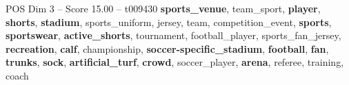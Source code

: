 \begin{textsample}{POS Dim 3 – Score 15.00 – t009430}  \label{ex:f3_pos_030}
\textbf{sports\_venue}, team\_sport, \textbf{player}, \textbf{shorts}, \textbf{stadium}, sports\_uniform, jersey, team, competition\_event, \textbf{sports}, \textbf{sportswear}, \textbf{active\_shorts}, tournament, football\_player, sports\_fan\_jersey, \textbf{recreation}, \textbf{calf}, championship, \textbf{soccer-specific\_stadium}, \textbf{football}, \textbf{fan}, \textbf{trunks}, \textbf{sock}, \textbf{artificial\_turf}, \textbf{crowd}, soccer\_player, \textbf{arena}, referee, training, coach

\end{textsample}
